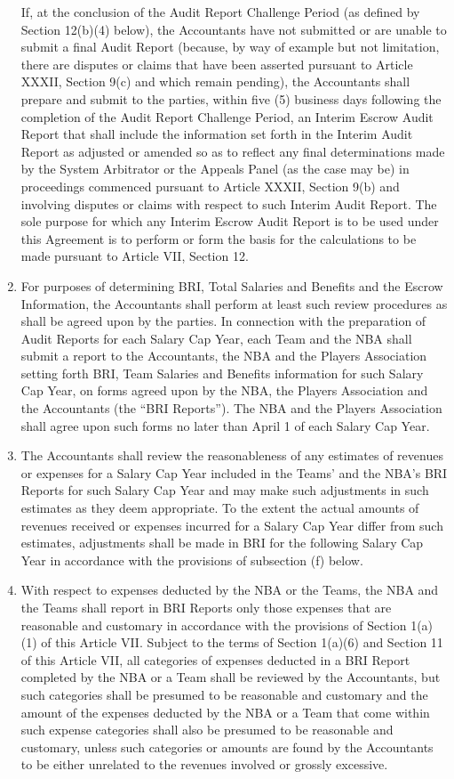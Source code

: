 \documentclass[
]{book}
\begin{document}
\begin{enumerate}
  If, at the conclusion of the Audit Report Challenge Period (as defined by Section 12(b)(4) below), the Accountants have not submitted or are unable to submit a final Audit Report (because, by way of example but not limitation, there are disputes or claims that have been asserted pursuant to Article XXXII, Section 9(c) and which remain pending), the Accountants shall prepare and submit to the parties, within five (5) business days following the completion of the Audit Report Challenge Period, an Interim Escrow Audit Report that shall include the information set forth in the Interim Audit Report as adjusted or amended so as to reflect any final determinations made by the System Arbitrator or the Appeals Panel (as the case may be) in proceedings commenced pursuant to Article XXXII, Section 9(b) and involving disputes or claims with respect to such Interim Audit Report. The sole purpose for which any Interim Escrow Audit Report is to be used under this Agreement is to perform or form the basis for the calculations to be made pursuant to Article VII, Section 12.
\item
  For purposes of determining BRI, Total Salaries and Benefits and the Escrow Information, the Accountants shall perform at least such review procedures as shall be agreed upon by the parties. In connection with the preparation of Audit Reports for each Salary Cap Year, each Team and the NBA shall submit a report to the Accountants, the NBA and the Players Association setting forth BRI, Team Salaries and Benefits information for such Salary Cap Year, on forms agreed upon by the NBA, the Players Association and the Accountants (the ``BRI Reports''). The NBA and the Players Association shall agree upon such forms no later than April 1 of each
  Salary Cap Year.
\item
  The Accountants shall review the reasonableness of any estimates of revenues or expenses for a Salary Cap Year included in the Teams' and the NBA's BRI Reports for such Salary Cap Year and may make such adjustments in such estimates as they deem appropriate. To the extent the actual amounts of revenues received or expenses incurred for a Salary Cap Year differ from such estimates, adjustments shall be made in BRI for the following Salary Cap Year in accordance with the provisions of subsection (f) below.
\item
  With respect to expenses deducted by the NBA or the Teams, the NBA and the Teams shall report in BRI Reports only those expenses that are reasonable and customary in accordance with the provisions of Section 1(a)(1) of this Article VII. Subject to the terms of Section 1(a)(6) and Section 11 of this Article VII, all categories of expenses deducted in a BRI Report completed by the NBA or a Team shall be reviewed by the Accountants, but such categories shall be presumed to be reasonable and customary and the amount of the expenses deducted by the NBA or a Team that come within such expense categories shall also be presumed to be reasonable and customary, unless such categories or amounts are found by the Accountants to be either unrelated to the revenues involved or grossly excessive.

\end{enumerate}
\end{document}
